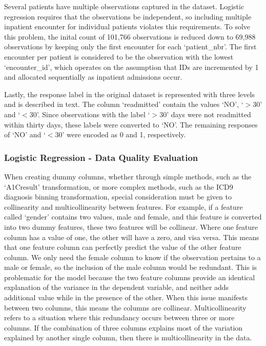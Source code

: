 \documentclass[sigconf]{acmart}
\begin{document}
Several patients have multiple observations captured in the dataset. Logistic regression requires that the observations be independent, so including multiple inpatient encounter for individual patients violates this requirements. To solve this problem, the inital count of 101,766 observations is reduced down to 69,988 observations by keeping only the first encounter for each `patient\_nbr'. The first encounter per patient is considered to be the observation with the lowest `encounter\_id', which operates on the assumption that IDs are incremented by 1 and allocated sequentially as inpatient admissions occur.

Lastly, the response label in the original dataset is represented with three levels and is described in text. The column `readmitted' contain the values `NO', `$>$30' and `$<$30'. Since observations with the label `$>$30' days were not readmitted within thirty days, these labels were converted to `NO'. The remaining responses of `NO' and `$<$30' were encoded as 0 and 1, respectively.

\subsubsection{Logistic Regression - Data Quality Evaluation}

When creating dummy columns, whether through simple methods, such as the `A1Cresult' transformation, or more complex methods, such as the ICD9 diagnosis binning transformation, special consideration must be given to collinearity and multicollinearity between features. For example, if a feature called `gender' contains two values, male and female, and this feature is converted into two dummy features, these two features will be collinear. Where one feature column has a value of one, the other will have a zero, and visa versa. This means that one feature column can perfectly predict the value of the other feature column. We only need the female column to know if the observation pertains to a male or female, so the inclusion of the male column would be redundant. This is problematic for the model because the two feature columns provide an identical explanation of the variance in the dependent variable, and neither adds additional value while in the presence of the other. When this issue manifests between two columns, this means the columns are collinear. Multicollinearity refers to a situation where this redundancy occurs between three or more columns. If the combination of three columns explains most of the variation explained by another single column, then there is multicollinearity in the data.
\end{document}
